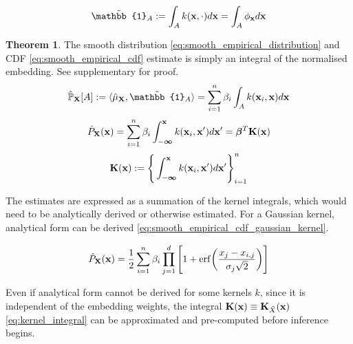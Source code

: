 \documentclass[twoside]{article} \usepackage{aistats2017}
\theoremstyle{definition}
\theoremstyle{theorem}
\newtheorem{theorem}{Theorem}[section]
\newcommand{\rv}[1]{{#1}}
\newcommand{\ds}[1]{\tilde{#1}}
\newcommand{\inner}[2]{{\langle #1, #2 \rangle}}
\begin{document}
		\begin{equation}
			\tilde{\mathbb{1}}_{A} := \int_{A} k(\bvec{x}, \cdot) d\bvec{x} = \int_{A} \phi_{\bvec{x}} d\bvec{x}
		\label{eq:indicator_smooth}
		\end{equation}
		
		\begin{theorem} \label{thm:smooth_empirical_distribution_and_cdf}
			The smooth distribution \eqref{eq:smooth_empirical_distribution} and CDF \eqref{eq:smooth_empirical_cdf} estimate is simply an integral of the normalised embedding. See supplementary for proof.
			\begin{equation}
				\hat{\mathbb{P}}_{\bvec{\rv{X}}}[A] := \inner{\hat{\mu}_{\bvec{\rv{X}}}}{\tilde{\mathbb{1}}_{A}} = \sum_{i = 1}^{n} \beta_{i} \int_{A}  k(\bvec{x}_{i}, \bvec{x}) d\bvec{x}
			\label{eq:smooth_empirical_distribution}
			\end{equation}	
			\begin{equation}
				\hat{P}_{\bvec{\rv{X}}}(\bvec{x}) = \sum_{i = 1}^{n} \beta_{i} \int_{-\bm{\infty}}^{\bvec{x}}  k(\bvec{x}_{i}, \bvec{x}') d\bvec{x}' = \bm{\beta}^{T} \bvec{K}(\bvec{x})
			\label{eq:smooth_empirical_cdf}
			\end{equation}
			\begin{equation}
				\mathbf{K}(\mathbf{x}) := \Bigg\{ \int_{-\bm{\infty}}^{\mathbf{x}}  k(\mathbf{x}_{i}, \mathbf{x}') d\mathbf{x}' \Bigg\}_{i = 1}^{n}
			\label{eq:kernel_integral}
			\end{equation}
		\end{theorem}

		The estimates are expressed as a summation of the kernel integrals, which would need to be analytically derived or otherwise estimated. For a Gaussian kernel, analytical form can be derived \eqref{eq:smooth_empirical_cdf_gaussian_kernel}.

		\begin{equation}
			\hat{P}_{\bvec{\rv{X}}}(\bvec{x}) = \frac{1}{2} \sum_{i = 1}^{n} \beta_{i} \prod_{j = 1}^{d} \Bigg[1 + \mathrm{erf}\bigg(\frac{x_{j} - x_{i, j}}{\sigma_{j} \sqrt{2}}\bigg)\Bigg]
		\label{eq:smooth_empirical_cdf_gaussian_kernel}
		\end{equation}

		Even if analytical form cannot be derived for some kernels $k$, since it is independent of the embedding weights, the integral $\bvec{K}(\bvec{x}) \equiv \bvec{K}_{\ds{X}}(\bvec{x})$ \eqref{eq:kernel_integral} can be approximated and pre-computed before inference begins.
\end{document}
